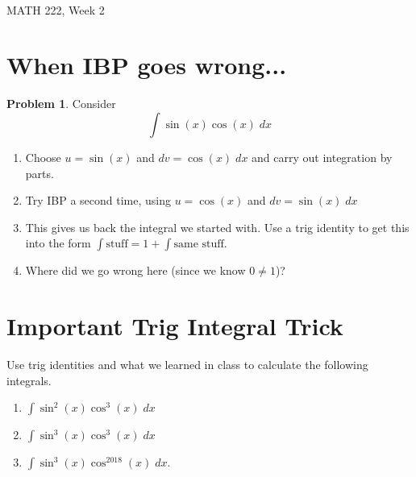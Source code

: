 \documentclass[11pt]{article}  %
\theoremstyle{definition}
\newtheorem{Prob}[Thm]{Problem}
\theoremstyle{remark}
\begin{document}
 \qquad\qquad\qquad\qquad\qquad\qquad\qquad\qquad\qquad\qquad{}\\[.2cm]
{\large MATH 222, Week 2}\newline \newline
{}
\newline
\thispagestyle{empty}  
\pagestyle{plain}
\setcounter{page}{1}

\section{When IBP goes wrong...}
\begin{Prob}
Consider
\[
\int \sin(x) \cos(x) \; dx
\]
\begin{enumerate}
\item Choose $u = \sin(x)$ and $dv = \cos(x) \; dx$ and carry out integration by parts.
\item Try IBP a second time, using $u = \cos(x)$ and $dv = \sin(x) \; dx$
\item This gives us back the integral we started with. Use a trig identity to get this into the form $\int \text{stuff} = 1 + \int \text{same stuff}$. 
\item Where did we go wrong here (since we know $0 \not= 1$)?
\end{enumerate}
\end{Prob}

\section{Important Trig Integral Trick}
Use trig identities and what we learned in class to calculate the following integrals.
\begin{enumerate}
\item $\int \sin^2(x) \cos^3(x) \; dx$
\item $\int \sin^3(x) \cos^3(x) \; dx$
\item $\int \sin^{3}(x) \cos^{2018}(x) \; dx$.
\end{enumerate}
\end{document}

